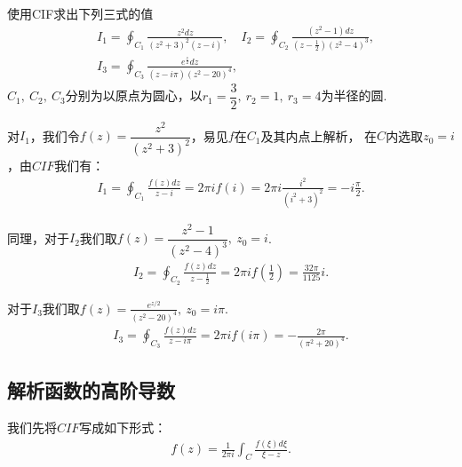 \documentclass[lang=cn, titlestyle=display, scheme=chinese]{elegantbook}
\begin{document}
                \begin{example}
                    使用CIF求出下列三式的值
                    \begin{align*}
                        &I_1 = \oint_{C_1}\frac{z^2dz}{(z^2+3)^2(z-i)},
                        \quad I_2=\oint_{C_2}\frac{(z^2-1)dz}{(z-\frac{1}{2})(z^2-4)^3},\\
                        &I_3=\oint_{C_3}\frac{e^{\frac{z}{2}}dz}{(z-i\pi)(z^2-20)^4},
                    \end{align*}
                    $C_1,\ C_2,\ C_3$分别为以原点为圆心，以$r_1=\dfrac{3}{2},\ r_2=1,\ r_3=4$为半径的圆.
                \end{example}
                \begin{solution}
                    对$I_1$，我们令$f(z) = \dfrac{z^2}{(z^2+3)^2}$，易见$f$在$C_1$及其内点上解析，
                    在$C$内选取$z_0 = i$，由$CIF$我们有：
                    \begin{align*}
                        I_1=\oint_{C_1}\frac{f(z)dz}{z-i}=2\pi i f(i)=2\pi i\frac{i^2}{(i^2+3)^2}=-i\frac{\pi}{2}.
                    \end{align*}

                    同理，对于$I_2$我们取$f(z) = \dfrac{z^2 - 1}{(z^2 - 4)^3},\ z_0 = i$.
                    \begin{align*}
                        I_2 = \oint_{C_2}\frac{f(z)dz}{z - \frac{1}{2}} = 2\pi i f(\frac{1}{2}) = \frac{32\pi}{1125}i.
                    \end{align*}

                    对于$I_3$我们取$f(z) = \frac{e^{z/2}}{(z^2 - 20)^4},\ z_0 = i\pi$.
                    \begin{align*}
                        I_3 = \oint_{C_3}\frac{f(z)dz}{z-i\pi}=2\pi i f(i\pi) = -\frac{2\pi}{(\pi^2+20)^4}.
                    \end{align*}
                \end{solution}

            \subsection{解析函数的高阶导数}
                我们先将$CIF$写成如下形式：
                \begin{align*}
                    f(z) = \frac{1}{2\pi i}\int_C \frac{f(\xi)d\xi}{\xi - z}.
                \end{align*}
\end{document}

